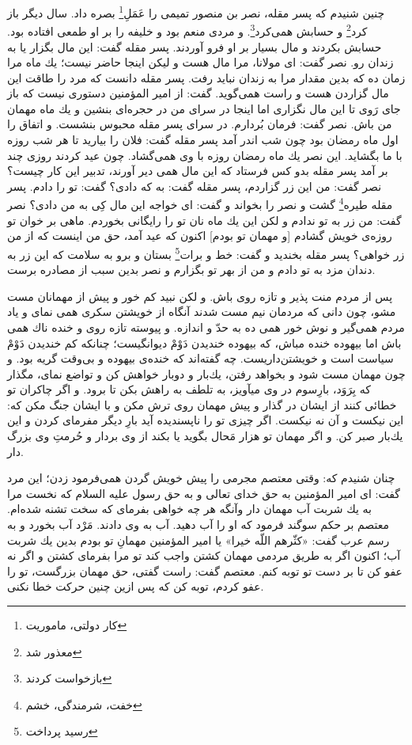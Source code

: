  چنين شنيدم كه پسر مقله، نصر بن منصور تميمى را عَمَلِ\footnote{کار دولتی، ماموریت} بصره داد.
سال ديگر باز كرد\footnote{معذور شد} و حسابش همى‌كرد\footnote{بازخواست کردند}. و مردى منعم بود و خليفه را بر او طمعى افتاده بود. حسابش بكردند و مال بسيار بر او فرو آوردند. پسر مقله گفت: اين مال بگزار يا به زندان رو. نصر گفت: اى مولانا، مرا مال هست و ليكن اينجا حاضر نيست؛ يك ماه مرا زمان ده كه بدين مقدار مرا به زندان نبايد رفت. پسر مقله دانست كه مرد را طاقت اين مال گزاردن هست و راست همى‌گويد. گفت: از امير المؤمنين دستورى نيست كه باز جاى رَوى تا اين مال نگزارى اما اينجا در سراى من در حجره‌اى بنشين و يك ماه مهمان من باش. نصر گفت: فرمان بُردارم. در سراى پسر مقله محبوس بنشست. و اتفاق را اول ماه رمضان بود چون شب اندر آمد پسر مقله گفت: فلان را بياريد تا هر شب روزه با ما بگشايد. اين نصر يك ماه رمضان روزه با وى همى‌گشاد. چون عيد كردند روزى چند بر آمد پسر مقله بدو كس فرستاد كه اين مال همى دير آورند، تدبير اين كار چيست‌؟ نصر گفت: من اين زر گزاردم، پسر مقله گفت: به كه دادى‌؟ گفت: تو را دادم. پسر مقله طيره\footnote{خفت، شرمندگی، خشم} گشت و نصر را بخواند و گفت: اى خواجه اين مال كِى به من دادى‌؟ نصر گفت: من زر به تو ندادم و لكن اين يك ماه نان تو را رايگانى بخوردم. ماهى بر خوان تو روزه‌ی خويش گشادم [و مهمان تو بودم] اكنون كه عيد آمد، حق من اينست كه از من زر خواهى‌؟ پسر مقله بخنديد و گفت: خط و برات\footnote{رسید پرداخت} بستان و برو به سلامت كه اين زر به دندان مزد به تو دادم و من از بهر تو بگزارم و نصر بدين سبب از مصادره برست.


پس از مردم منت پذير و تازه روى باش. و لكن نبيد كم خور و پيش از مهمانان مست مشو، چون دانى كه مردمان نيم مست شدند آنگاه از خويشتن سكرى همى نماى و ياد مردم همى‌گير و نوش خور همى ده به حدّ و اندازه. و پيوسته تازه روى و خنده ناك همى باش اما بيهوده خنده مباش، كه بيهوده خنديدن دَوْمْ ديوانگيست؛ چنانكه كم خنديدن دَوْمْ سياست است و خويشتن‌داريست. چه گفته‌اند كه خنده‌ی بيهوده و بى‌وقت گريه بود. و چون مهمان مست شود و بخواهد رفتن، يك‌بار و دوبار خواهش كن و تواضع نماى، مگذار كه بِرَوَد، بارِسوم در وى ميآويز، به تلطف به راهش بكن تا برود. و اگر چاكران تو خطائى كنند از ايشان در گذار و پيش مهمان روى ترش مكن و با ايشان جنگ مكن كه: اين نيكست و آن نه نيكست. اگر چيزى تو را ناپسنديده آيد بارِ ديگر مفرماى كردن و اين يك‌بار صبر كن. و اگر مهمان تو هزار مَحال بگويد يا بكند از وى بردار و حُرمتِ وى بزرگ دار.

 چنان شنيدم كه: وقتى معتصم مجرمى را پيش خويش گردن همی‌فرمود زدن؛ اين مرد گفت: اى امير المؤمنين به حق خداى تعالى و به حق رسول عليه السلام كه نخست مرا به يك شربت آب مهمان دار وآنگه هر چه خواهى بفرماى كه سخت تشنه شده‌ام. معتصم بر حكم سوگند فرمود كه او را آب دهيد. آب به وى دادند. مَرْد آب بخورد و به رسم عرب گفت: «كثّرهم اللّه خيرا» يا امير المؤمنين مهمانِ تو بودم بدين يك شربت آب؛ اكنون اگر به طريق مردمى مهمان كشتن واجب كند تو مرا بفرماى كشتن و اگر نه عفو كن تا بر دست تو توبه كنم. معتصم گفت: راست گفتى، حق مهمان بزرگست، تو را عفو كردم، توبه كن كه پس ازين چنين حركت خطا نكنى.

